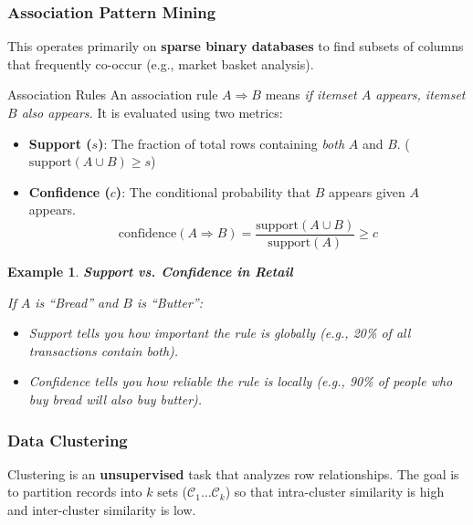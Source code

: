 \documentclass[11pt]{article}
\theoremstyle{smallexample}
\newtheorem{example}{Example}[section]
\newcommand{\vs}{\vspace{0.2\baselineskip}}
\begin{document}
\subsubsection{Association Pattern Mining}

This operates primarily on \textbf{sparse binary databases} to find subsets of columns that frequently co-occur (e.g., market basket analysis).

\begin{defbox}{Association Rules}
    An association rule $A \Rightarrow B$ means \textit{if itemset $A$ appears, itemset $B$ also appears.} It is evaluated using two metrics:
    \begin{itemize}
        \item \textbf{Support ($s$)}: The fraction of total rows containing \textit{both} $A$ and $B$. ($\text{support}(A \cup B) \geq s$)
        \item \textbf{Confidence ($c$)}: The conditional probability that $B$ appears given $A$ appears. 
        \[ \text{confidence}(A \Rightarrow B) = \frac{\text{support}(A \cup B)}{\text{support}(A)} \geq c \]
    \end{itemize}
\end{defbox}

\vs

\begin{example}{\textbf{Support vs. Confidence in Retail}}

    If $A$ is ``Bread'' and $B$ is ``Butter'':
    \begin{itemize}
        \item Support tells you how important the rule is globally (e.g., 20\% of all transactions contain both).
        \item Confidence tells you how reliable the rule is locally (e.g., 90\% of people who buy bread will also buy butter).
    \end{itemize}
\end{example}

\subsubsection{Data Clustering}

Clustering is an \textbf{unsupervised} task that analyzes row relationships. The goal is to partition records into $k$ sets ($\mathcal{C}_1 \ldots \mathcal{C}_k$) so that intra-cluster similarity is high and inter-cluster similarity is low.
\end{document}
